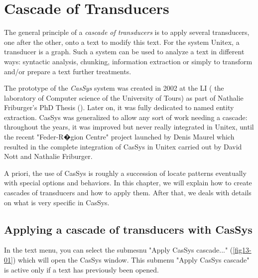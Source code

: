 \chapter{Cascade of Transducers}
\label{chap-cassys}

The general principle of a \textit{cascade of transducers}  is to apply several transducers, one 
after the other, onto a text to modify this text. For the system Unitex, a transducer is a graph. Such a system can be used to analyze a 
text in different ways: syntactic analysis, chunking, information extraction or simply to transform and/or prepare a text further treatments.

\bigskip
\noindent The prototype of the \textit{CasSys}  system was created in 2002 at the LI 
( the laboratory of Computer science of the University of Tours) as part of Nathalie Friburger's PhD Thesis (\cite{reco-np-friburger02}). 
Later on, it was fully dedicated to named entity extraction. CasSys was generalized to allow any sort of work needing a cascade: throughout the years, 
 it was improved but never really integrated in Unitex, until the recent "Feder-R�gion Centre" project launched by Denis Maurel which resulted in the complete integration of CasSys in Unitex carried out by David Nott and Nathalie Friburger. 


\bigskip
\noindent A priori, the use of CasSys is roughly a succession of locate patterns eventually with special options and behaviors. 
In this chapter, we will explain how to create cascades of transducers and how to apply them. After that, we deals with details on what is very specific in CasSys.

\section{Applying a cascade of transducers with CasSys}
\label{section:applyCascade}

In the text menu, you can select the submesnu "Apply CasSys cascade..." (\ref{fig13-01}) which will open the CasSys window.
This submenu "Apply CasSys cascade" is active only if a text has previously been opened.

